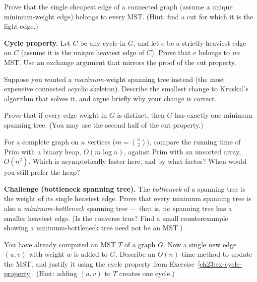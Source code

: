 \begin{exercise}\label{ch23:ex-cheapest-edge}
Prove that the single cheapest edge of a connected graph (assume a unique
minimum-weight edge) belongs to every MST. (Hint: find a cut for which it is the
light edge.)
\end{exercise}

\begin{exercise}\label{ch23:ex-cycle-property}
\textbf{Cycle property.} Let $C$ be any cycle in $G$, and let $e$ be a
strictly-heaviest edge on $C$ (assume it is the unique heaviest edge of $C$).
Prove that $e$ belongs to \emph{no} MST. Use an exchange argument that mirrors the
proof of the cut property.
\end{exercise}

\begin{exercise}\label{ch23:ex-maximum}
Suppose you wanted a \emph{maximum}-weight spanning tree instead (the most
expensive connected acyclic skeleton). Describe the smallest change to Kruskal's
algorithm that solves it, and argue briefly why your change is correct.
\end{exercise}

\begin{exercise}\label{ch23:ex-unique}
Prove that if every edge weight in $G$ is distinct, then $G$ has exactly one
minimum spanning tree. (You may use the second half of the cut property.)
\end{exercise}

\begin{exercise}\label{ch23:ex-prim-array}
For a complete graph on $n$ vertices ($m = \binom{n}{2}$), compare the running
time of Prim with a binary heap, $O(m\log n)$, against Prim with an unsorted
array, $O(n^2)$. Which is asymptotically faster here, and by what factor? When
would you still prefer the heap?
\end{exercise}

\begin{exercise}\label{ch23:ex-bottleneck}
\textbf{Challenge (bottleneck spanning tree).} The \emph{bottleneck} of a
spanning tree is the weight of its single heaviest edge. Prove that every minimum
spanning tree is also a \emph{minimum-bottleneck} spanning tree --- that is, no
spanning tree has a smaller heaviest edge. (Is the converse true? Find a small
counterexample showing a minimum-bottleneck tree need not be an MST.)
\end{exercise}

\begin{exercise}\label{ch23:ex-add-edge}
You have already computed an MST $T$ of a graph $G$. Now a single new edge
$(u,v)$ with weight $w$ is added to $G$. Describe an $O(n)$-time method to update
the MST, and justify it using the cycle property from
Exercise~\ref{ch23:ex-cycle-property}. (Hint: adding $(u,v)$ to $T$ creates one
cycle.)
\end{exercise}

